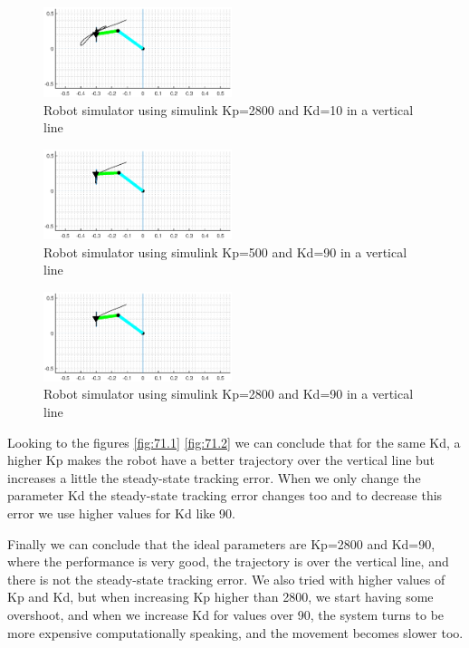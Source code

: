 \begin{figure}[H]
    \centering
    \includegraphics[width=0.49\textwidth]{imgs/71.2.eps}
    \caption{Robot simulator using simulink Kp=2800 and Kd=10 in a vertical line}
    \label{fig:71.2}
\end{figure}

\begin{figure}[H]
    \centering
    \includegraphics[width=0.49\textwidth]{imgs/71.3.eps}
    \caption{Robot simulator using simulink Kp=500 and Kd=90 in a vertical line}
    \label{fig:71.3}
\end{figure}

\begin{figure}[H]
    \centering
    \includegraphics[width=0.49\textwidth]{imgs/71.4.eps}
    \caption{Robot simulator using simulink Kp=2800 and Kd=90 in a vertical line}
    \label{fig:71.4}
\end{figure}

Looking to the figures \eqref{fig:71.1} \eqref{fig:71.2} we can conclude that for the same Kd, a higher Kp makes the robot have a better trajectory over the vertical line but increases a little the steady-state tracking error. When we only change the parameter Kd the steady-state tracking error changes too and to decrease this error we use higher values for Kd like 90.

Finally we can conclude that the ideal parameters are Kp=2800 and Kd=90, where the performance is very good, the trajectory is over the vertical line, and there is not the steady-state tracking error. We also tried with higher values of Kp and Kd, but when increasing Kp higher than 2800, we start having some overshoot, and when we increase Kd for values over 90, the system turns to be more expensive computationally speaking, and the movement becomes slower too.

